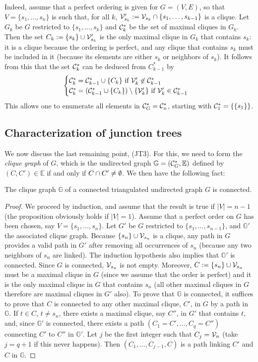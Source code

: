 Indeed, assume that a perfect ordering is given for $G = (V, E)$, so
that $V = \{s_1, \ldots, s_n\}$ is such that, for all $k$, 
${\mathcal V}_{s_k}':={\mathcal V}_{s_k}\cap\{s_1, \ldots, s_{k-1}\}$ is a clique. Let $G_k$ be $G$ restricted
to $\{s_1, \ldots, s_k\}$ and ${\mathcal C}^*_k$ be the set of maximal cliques
in $G_k$. Then the set $C_k := \{s_k\} \cup
{\mathcal V}_{s_k}'$ is the only maximal clique in $G_k$ that contains $s_k$: it is a clique because  the
ordering is perfect, and any clique that contains $s_k$ must be included in it (because its elements are either $s_k$ or neighbors of $s_k$). It follows from this that the set ${\mathcal C}^*_k$ can be deduced
from $C^*_{k-1}$ by
\[
\begin{cases}
{\mathcal C}^*_k = {\mathcal C}^*_{k-1} \cup \{C_k\} \text{ if } {\mathcal V}_k'\not\in {\mathcal C}^*_{k-1}\\  
{\mathcal C}^*_k = ({\mathcal C}^*_{k-1} \cup \{C_k\}) \setminus \{{\mathcal V}'_k\} \text{ if } {\mathcal V}_k'\in
{\mathcal C}^*_{k-1}
\end{cases} 
\]
This allows one to enumerate all elements in ${\mathcal C}^*_G={\mathcal C}^*_n$,
starting with ${\mathcal C}^*_1 = \{\{s_1\}\}$.

\subsection{Characterization of junction trees}
We now discuss the last remaining point, (JT3). For this, we need to form
the {\em clique graph} of $G$, which is the undirected  graph $\mathbb
G = ({\mathcal C}_G^*, \mathbb E)$ defined by
$(C, C') \in \mathbb E$ if and only if $C\cap C'\neq
\emptyset$. We then have the following fact:
\begin{proposition}
\label{prop:clq.conn}
The clique graph $\mathbb G$ of a connected triangulated undirected
graph $G$  is connected.
\end{proposition}
\begin{proof} 
We proceed by induction, and assume that the result is true if $|V| =
n-1$ (the proposition obviously holds if $|V|=1$).
Assume that a perfect
order on $G$ has been chosen, say $V = \{s_1, \ldots, s_n\}$. Let
$G'$ be $G$ restricted to $\{s_1, \ldots, s_{n-1}\}$,
and $\mathbb G'$ the associated clique graph. Because $\{s_n\} \cup
{\mathcal V}_{s_n}$ is a clique, any path in $G$ provides a valid path in $G'$
after removing all occurrences of $s_n$ (because any two neighbors of
$s_n$ are linked). The induction hypothesis also implies that $\mathbb
G'$ is connected. 
Since $G$ is connected, ${\mathcal V}_{s_n}$ is not
empty. Moreover, $C:=\{s_n\}\cup {\mathcal V}_{s_n}$ must be a maximal clique in
$G$ (since we assume that the order is perfect) and it is the only
maximal clique in $G$ that contains $s_n$ (all other maximal cliques
in $G$ therefore are maximal cliques in $G'$ also). To prove that $\mathbb
G$ is connected, it 
suffices to prove that $C$ is connected to any other maximal clique, $C'$, in
$G$ by a path in $\mathbb G$. If $t\in C$, $t\neq s_n$, there exists a
maximal clique, say $C''$, in $G'$ that contains $t$, and, since
$\mathbb G'$ is connected, there exists a path
$(C_1=C', \ldots, C_q = C'')$
connecting $C'$ to $C''$ in $\mathbb G'$. Let $j$ be the first integer such that $C_j = {\mathcal V}_{n}$ (take $j={q+1}$ if this never
happens). Then $(C_1, \ldots, C_{j-1}, C)$ is a path linking $C'$ and $C$
in $\mathbb G$.
\end{proof}

